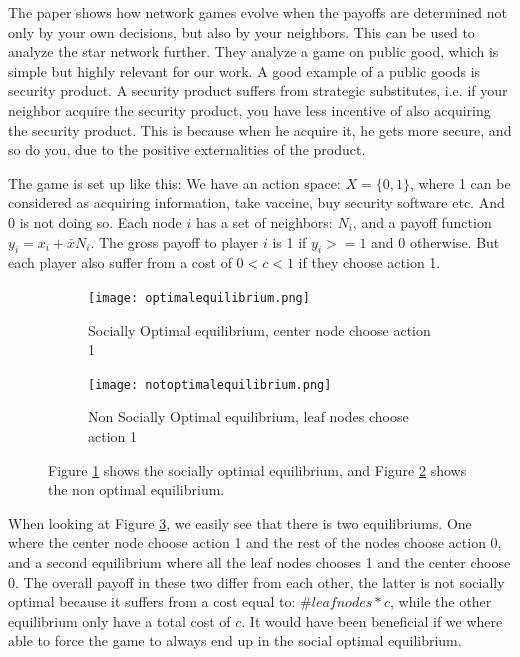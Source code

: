 The paper \cite{networkgames} shows how network games evolve when the payoffs are determined not only by your own decisions, but also by your neighbors. This can be used to analyze the star network further. They analyze a game on public good, which is simple but highly relevant for our work. A good example of a public goods is security product. A security product suffers from strategic substitutes, i.e. if your neighbor acquire the security product, you have less incentive of also acquiring the security product. This is because when he acquire it, he gets more secure, and so do you, due to the positive externalities of the product.

The game is set up like this:
We have an action space: $X=\{0,1\}$, where 1 can be considered as acquiring information, take vaccine, buy security software etc. And 0 is not doing so.
Each node $i$ has a set of neighbors: $N_{i} $, and a payoff function $y_{i}=x_{i}+\bar{x}N_{i}$. 
The gross payoff to player $i$ is 1 if $y_{i}>=1$ and 0 otherwise. But each player also suffer from a cost of $0<c<1$ if they choose action 1.
\begin{figure}[h]
\centering
\begin{subfigure}{.4\textwidth}
  \centering
  \texttt{[image: optimalequilibrium.png]}
  \caption{\label{fig:optequi} Socially Optimal equilibrium, center node choose action 1}
\end{subfigure}
\quad
\begin{subfigure}{.4\textwidth}
  \centering
  \texttt{[image: notoptimalequilibrium.png]}
  \caption{\label{fig:notoptequi} Non Socially Optimal equilibrium, leaf nodes choose action 1}
\end{subfigure}
\caption{\label{fig:starequi} Figure \ref{fig:optequi} shows the socially optimal equilibrium, and Figure \ref{fig:notoptequi} shows the non optimal equilibrium.}

\end{figure}
When looking at Figure \ref{fig:starequi}, we easily see that there is two equilibriums. One where the center node choose action 1 and the rest of the nodes choose action 0, and a second equilibrium where all the leaf nodes chooses 1 and the center choose 0.
The overall payoff in these two differ from each other, the latter is not socially optimal because it
 suffers from a cost equal to: $\#leaf nodes*c$, while the other equilibrium only have a total cost of $c$.
 It would have been beneficial if we where able to force the game to always end up in the social optimal equilibrium.


